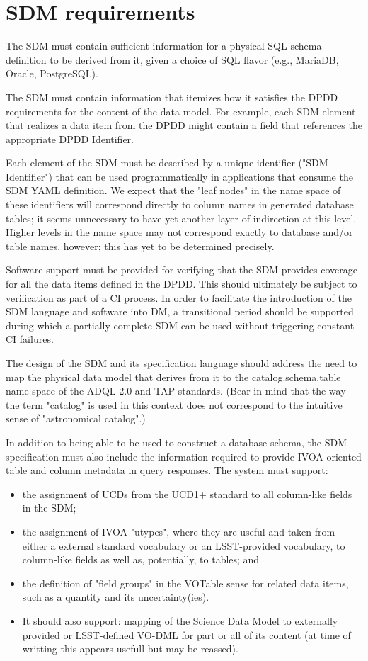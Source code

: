 
\section{SDM requirements}\label{sec:sdm}
The SDM must contain sufficient information for a physical SQL schema definition to be derived from it, given a choice of SQL flavor (e.g., MariaDB, Oracle, PostgreSQL).

The SDM must contain information that itemizes how it satisfies the DPDD requirements for the content of the data model.  For example, each SDM element that realizes a data item from the DPDD might contain a field that references the appropriate DPDD Identifier.

Each element of the SDM must be described by a unique identifier ("SDM Identifier") that can be used programmatically in applications that consume the SDM YAML definition.  We expect that the "leaf nodes" in the name space of these identifiers will correspond directly to column names in generated database tables; it seems unnecessary to have yet another layer of indirection at this level.  Higher levels in the name space may not correspond exactly to database and/or table names, however; this has yet to be determined precisely.

Software support must be provided for verifying that the SDM provides coverage for all the data items defined in the DPDD.  This should ultimately be subject to verification as part of a CI process.  In order to facilitate the introduction of the SDM language and software into DM, a transitional period should be supported during which a partially complete SDM can be used without triggering constant CI failures.

The design of the SDM and its specification language should address the need to map the physical data model that derives from it to the catalog.schema.table name space of the ADQL 2.0 and TAP standards.  (Bear in mind that the way the term "catalog" is used in this context does not correspond to the intuitive sense of "astronomical catalog".)

In addition to being able to be used to construct a database schema, the SDM specification must also include the information required to provide IVOA-oriented table and column metadata in query responses.  The system must support:

\begin{itemize}
\item      the assignment of UCDs from the UCD1+ standard to all column-like fields in the SDM;
    \item the assignment of IVOA "utypes", where they are useful and taken from either a external standard vocabulary or an LSST-provided vocabulary, to column-like fields as well as, potentially, to tables; and
    \item the definition of "field groups" in the VOTable sense for related data items, such as a quantity and its uncertainty(ies).
\item It should also support:
    mapping of the Science Data Model to externally provided or LSST-defined VO-DML for part or all of its content (at time of writting this appears usefull but may be reassed).
\end{itemize}


